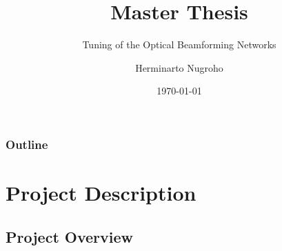 \documentclass{beamer}
\title[DCSC]{Master Thesis}
\subtitle {Tuning of the Optical Beamforming Networks}
\institute[TU Delft]{Delft University of Technology}
\author{Herminarto Nugroho}
\date{\today}
\newcommand*\titleTOC{Outline}
\begin{document}
{
\frame{\titlepage}
}

{
\begin{frame}\frametitle{\titleTOC}
	\tableofcontents
\end{frame}
}

\section{Project Description}
\subsection{Project Overview}
\end{document}
